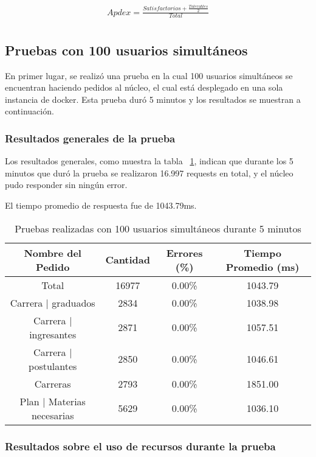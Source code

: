 \begin{align*}
  Apdex = \frac{Satisfactorios + \frac{Tolerables}{2}}{Total}\\
\end{align*}

\break
\subsection{Pruebas con 100 usuarios simultáneos}
En primer lugar, se realizó una prueba en la cual 100 usuarios simultáneos se encuentran haciendo pedidos al núcleo, el cual está desplegado en una sola instancia de docker.
Esta prueba duró 5 minutos y los resultados se muestran a continuación.


\subsubsection{Resultados generales de la prueba}


Los resultados generales, como muestra la tabla ~\ref{tab:100u_5m_gen}, indican que durante los 5 minutos que duró la prueba se realizaron 16.997 requests en total, y el núcleo pudo responder sin ningún error.

El tiempo promedio de respuesta fue de 1043.79ms.

\begin{table}[!htbp]
    \centering
    \makegapedcells
    \begin{tabular}{|c|c|c|c|}
    \hline
    Nombre del Pedido & Cantidad & Errores (\%) & Tiempo Promedio (ms) \\ \hline
    Total & 16977 & 0.00\% & 1043.79\\ \hline
    Carrera | graduados & 2834 & 0.00\% & 1038.98\\ \hline
    Carrera | ingresantes & 2871 & 0.00\% & 1057.51\\ \hline
    Carrera | postulantes & 2850 & 0.00\% & 1046.61\\ \hline
    Carreras & 2793 & 0.00\% & 1851.00\\ \hline
    Plan | Materias necesarias & 5629 & 0.00\% & 1036.10\\ \hline
    
    \end{tabular}
    \caption{Pruebas realizadas con 100 usuarios simultáneos durante 5 minutos}
    \label{tab:100u_5m_gen}
\end{table}


\subsubsection{Resultados sobre el uso de recursos durante la prueba}

